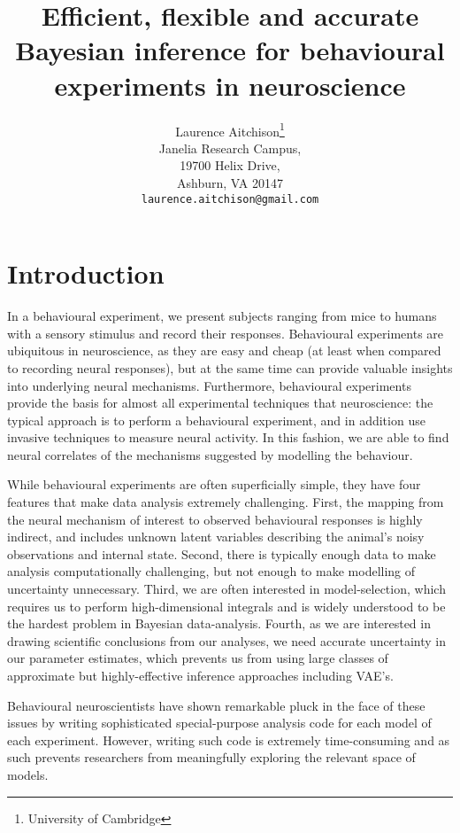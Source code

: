 \documentclass{article}
\title{Efficient, flexible and accurate Bayesian inference for behavioural experiments in neuroscience}
\author{%
  Laurence Aitchison\thanks{University of Cambridge}\\
  Janelia Research Campus,\\
  19700 Helix Drive,\\
  Ashburn, VA 20147 \\
  \texttt{laurence.aitchison@gmail.com}
}
\begin{document}
\maketitle

\begin{abstract}

\end{abstract}

\section{Introduction}
In a behavioural experiment, we present subjects ranging from mice to humans with a sensory stimulus and record their responses.
Behavioural experiments are ubiquitous in neuroscience, as they are easy and cheap (at least when compared to recording neural responses), but at the same time can provide valuable insights into underlying neural mechanisms.
Furthermore, behavioural experiments provide the basis for almost all experimental techniques that  neuroscience: the typical approach is to perform a behavioural experiment, and in addition use invasive techniques to measure neural activity.
In this fashion, we are able to find neural correlates of the mechanisms suggested by modelling the behaviour.

While behavioural experiments are often superficially simple, they have four features that make data analysis extremely challenging.
First, the mapping from the neural mechanism of interest to observed behavioural responses is highly indirect, and includes unknown latent variables describing the animal's noisy observations and internal state.
Second, there is typically enough data to make analysis computationally challenging, but not enough to make modelling of uncertainty unnecessary.
Third, we are often interested in model-selection, which requires us to perform high-dimensional integrals and is widely understood to be the hardest problem in Bayesian data-analysis.
Fourth, as we are interested in drawing scientific conclusions from our analyses, we need accurate uncertainty in our parameter estimates, which prevents us from using large classes of approximate but highly-effective inference approaches including VAE's.

Behavioural neuroscientists have shown remarkable pluck in the face of these issues by writing sophisticated special-purpose analysis code for each model of each experiment.
However, writing such code is extremely time-consuming and as such prevents researchers from meaningfully exploring the relevant space of models.
\end{document}

